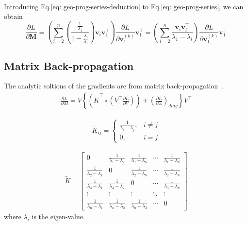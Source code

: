 \documentclass{article}
\newcommand{\bM}{\mathbf{M}}
\newcommand{\bv}{\mathbf{v}}
\begin{document}
	Introducing Eq.\ref{eq: geo-prog-series-deduction} to Eq.\ref{eq: geo-prog-series}, we can obtain	
	\begin{equation}
	\frac{\partial L}{\partial \bM}
	=\left(\sum_{i=2}^{n}\left(
	\frac{\frac{1}{\lambda_{1}}}
	{1 - \frac{\lambda_{i}}{\lambda_{1}}}
	\right)
	\bv_{i}\bv_{i}^{\top}
	\right)\frac{\partial L}{\partial \bv_{1}^{(k)}}\bv_{1}^{\top}
	=\left(\sum_{i=2}^{n}
	\frac{\bv_{i}\bv_{i}^{\top}}
	{\lambda_{1} - \lambda_{i}}
	\right)\frac{\partial L}{\partial \bv_{1}^{(k)}}\bv_{1}^{\top}
	\label{eq: final-form}
	\end{equation}
	
	\subsection{Matrix Back-propagation}
	\label{sec: mbp}
	The analytic soltions of the gradients are from matrix back-propagation~\cite{ionescu2015matrix}.
	\begin{equation}
	\begin{aligned}
	\frac{\partial L}{\partial M}=V\left\{\left(\tilde{K}^{\top} \circ\left(V^{\top} \frac{\partial L}{\partial V}\right)\right)+\left(\frac{\partial L}{\partial \Sigma}\right)_{d i a g}\right\} V^{\top}
	\end{aligned}
	\end{equation}
	
	\begin{equation}
	\begin{aligned}
	\tilde{K}_{i j}=\left\{\begin{array}{ll}{\frac{1}{\lambda_{i}-\lambda_{j}},} & {i \neq j} \\ {0,} & {i=j}\end{array}\right.
	\end{aligned}
	\end{equation}
	
	\begin{equation}
	\begin{aligned}
	\tilde{K} = 
	\begin{bmatrix}
	0  &\frac{1}{\lambda_{1} - \lambda_{2}} &\frac{1}{\lambda_{1} - \lambda_{3}} &\cdots &\frac{1}{\lambda_{1} - \lambda_{n}}\\
	\frac{1}{\lambda_{2} - \lambda_{1}} &0 &\frac{1}{\lambda_{2} - \lambda_{3}} &\cdots &\frac{1}{\lambda_{2} - \lambda_{n}}\\
	\frac{1}{\lambda_{3} - \lambda_{1}} &\frac{1}{\lambda_{3} - \lambda_{2}} &0 &\cdots &\frac{1}{\lambda_{3} - \lambda_{n}}\\
	\vdots &\vdots &\vdots &\ddots &\vdots\\
	\frac{1}{\lambda_{n} - \lambda_{1}} &\frac{1}{\lambda_{n} - \lambda_{2}} &\frac{1}{\lambda_{n} - \lambda_{3}} &\cdots &0
	\end{bmatrix}
	\end{aligned}
	\end{equation}
	where $\lambda_{i}$ is the eigen-value.
	
\end{document}
